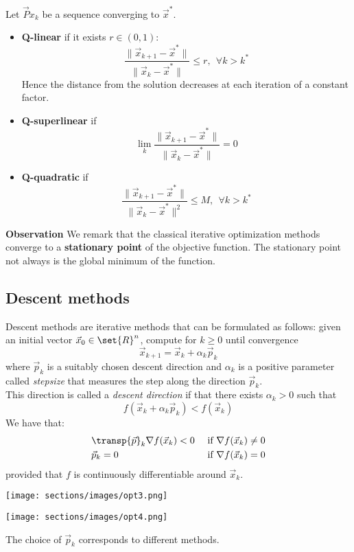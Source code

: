  Let $\vec P{x}_k$ be a sequence converging to $\vec{x}^*$.
\begin{itemize}
    \item \textbf{Q-linear}  if it exists $r \in (0,1)$:
    $$\frac{\|\vec{x}_{k+1}-\vec{x}^*\|}{\|\vec{x}_{k}-\vec{x}^*\|} \leq r, \ \ \forall k > k^*$$
    Hence the distance from the solution decreases at each iteration of a constant factor.
    \item \textbf{Q-superlinear} if 
    $$\lim_k \frac{\|\vec{x}_{k+1}-\vec{x}^*\|}{\|\vec{x}_{k}-\vec{x}^*\|}=0$$
    \item \textbf{Q-quadratic}
    if $$\frac{\|\vec{x}_{k+1}-\vec{x}^*\|}{\|\vec{x}_{k}-\vec{x}^*\|^2} \leq M, \ \ \forall k > k^*$$
\end{itemize}

\textbf{Observation} We remark that the classical iterative optimization methods converge to a \textbf{stationary point} of the objective function. The stationary point not always is the global minimum of the function.


\subsection{Descent methods}
Descent methods are iterative methods that can be formulated as follows: given an initial vector $\vec{x}_0 \in \set{R}^n$, compute for $k \geq 0$ until convergence
$$ \vec{x}_{k+1} = \vec{x}_k + \alpha_k\vec{p}_k $$
where $\vec{p}_k$ is a suitably chosen descent direction and $\alpha_k$ is a positive parameter called \textit{stepsize} that measures the step along the direction $\vec{p}_k$. \\
This direction is called a \textit{descent direction} if   that there exists $\alpha_k > 0$ such that
$$ f(\vec{x}_k + \alpha_k\vec{p}_k) < f(\vec{x}_k) $$
We have that:
$$
    \begin{aligned}
        &\transp{\vec{p}}_k\nabla{f}(\vec{x}_k) < 0 &\text{ if } \nabla{f}(\vec{x}_k) \neq 0\\
        &\vec{p}_k = 0 &\text{ if } \nabla{f}(\vec{x}_k) = 0
    \end{aligned}
$$
provided that $f$ is continuously differentiable around $\vec{x}_k$.


\texttt{[image: sections/images/opt3.png]}

\texttt{[image: sections/images/opt4.png]}

The choice of $\vec{p}_k$ corresponds to different methods.

